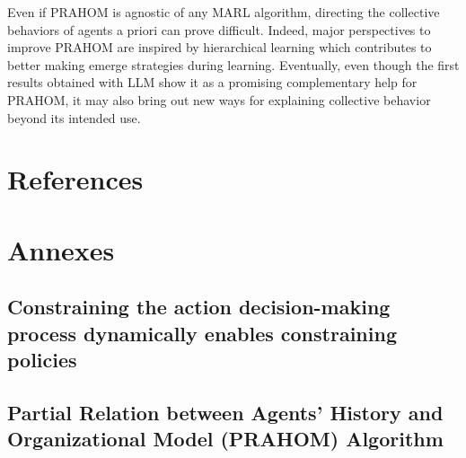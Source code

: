 \documentclass[runningheads]{llncs}
\theoremstyle{freethm}
\theoremstyle{proofoutline}
\newcounter{proof}
\begin{document}
Even if PRAHOM is agnostic of any MARL algorithm, directing the collective behaviors of agents a priori can prove difficult. Indeed, major perspectives to improve PRAHOM are inspired by hierarchical learning which contributes to better making emerge strategies during learning.
Eventually, even though the first results obtained with LLM show it as a promising complementary help for PRAHOM, it may also bring out new ways for explaining collective behavior beyond its intended use.


\section*{References}





\newpage

\section*{Annexes}\label{proof:jpc_to_ac}

\subsection*{Constraining the action decision-making process dynamically enables constraining policies}


\newpage

\subsection*{Partial Relation between Agents' History and Organizational Model (PRAHOM) Algorithm}

\end{document}
